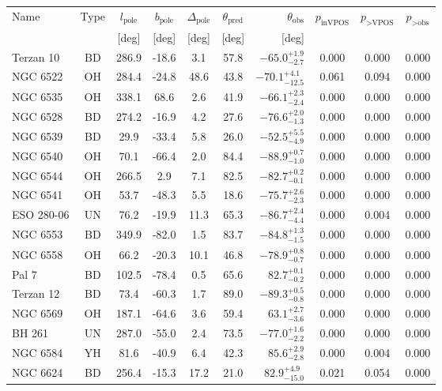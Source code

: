 \begingroup
\renewcommand{\arraystretch}{1.25}
\begin{tabular}{lcccccrccc}
	\toprule
	Name & Type & $l_\text{pole}$ & $b_\text{pole}$ & $\Delta_\text{pole}$ & $\theta_\text{pred}$ & $\theta_\text{obs}$ & $p_\text{inVPOS}$ & $p_\text{>VPOS}$ & $p_\text{>obs}$ \\
	 &  & [deg] & [deg] & [deg] & [deg] & [deg] &  &  &  \\
	\midrule
	Terzan 10 & BD & 286.9 & -18.6 & 3.1 & 57.8 & $-65.0^{+1.9}_{-2.7}$ & 0.000 & 0.000 & 0.000 \\
	NGC 6522 & OH & 284.4 & -24.8 & 48.6 & 43.8 & $-70.1^{+4.1}_{-12.5}$ & 0.061 & 0.094 & 0.000 \\
	NGC 6535 & OH & 338.1 & 68.6 & 2.6 & 41.9 & $-66.1^{+2.3}_{-2.4}$ & 0.000 & 0.000 & 0.000 \\
	NGC 6528 & BD & 274.2 & -16.9 & 4.2 & 27.6 & $-76.6^{+2.0}_{-1.3}$ & 0.000 & 0.000 & 0.000 \\
	NGC 6539 & BD & 29.9 & -33.4 & 5.8 & 26.0 & $-52.5^{+5.5}_{-4.9}$ & 0.000 & 0.000 & 0.000 \\
	NGC 6540 & OH & 70.1 & -66.4 & 2.0 & 84.4 & $-88.9^{+0.7}_{-1.0}$ & 0.000 & 0.000 & 0.000 \\
	NGC 6544 & OH & 266.5 & 2.9 & 7.1 & 82.5 & $-82.7^{+0.2}_{-0.1}$ & 0.000 & 0.000 & 0.000 \\
	NGC 6541 & OH & 53.7 & -48.3 & 5.5 & 18.6 & $-75.7^{+2.6}_{-2.3}$ & 0.000 & 0.000 & 0.000 \\
	ESO 280-06 & UN & 76.2 & -19.9 & 11.3 & 65.3 & $-86.7^{+2.4}_{-4.4}$ & 0.000 & 0.004 & 0.000 \\
	NGC 6553 & BD & 349.9 & -82.0 & 1.5 & 83.7 & $-84.8^{+1.3}_{-1.5}$ & 0.000 & 0.000 & 0.000 \\
	NGC 6558 & OH & 66.2 & -20.3 & 10.1 & 46.8 & $-78.9^{+0.8}_{-0.7}$ & 0.000 & 0.000 & 0.000 \\
	Pal 7 & BD & 102.5 & -78.4 & 0.5 & 65.6 & $82.7^{+0.1}_{-0.2}$ & 0.000 & 0.000 & 0.000 \\
	Terzan 12 & BD & 73.4 & -60.3 & 1.7 & 89.0 & $-89.3^{+0.5}_{-0.8}$ & 0.000 & 0.000 & 0.000 \\
	NGC 6569 & OH & 187.1 & -64.6 & 3.6 & 59.4 & $63.1^{+2.7}_{-3.6}$ & 0.000 & 0.000 & 0.000 \\
	BH 261 & UN & 287.0 & -55.0 & 2.4 & 73.5 & $-77.0^{+1.6}_{-2.2}$ & 0.000 & 0.000 & 0.000 \\
	NGC 6584 & YH & 81.6 & -40.9 & 6.4 & 42.3 & $85.6^{+2.9}_{-2.8}$ & 0.000 & 0.004 & 0.000 \\
	NGC 6624 & BD & 256.4 & -15.3 & 17.2 & 21.0 & $82.9^{+4.9}_{-15.0}$ & 0.021 & 0.054 & 0.000 \\

\end{tabular}
